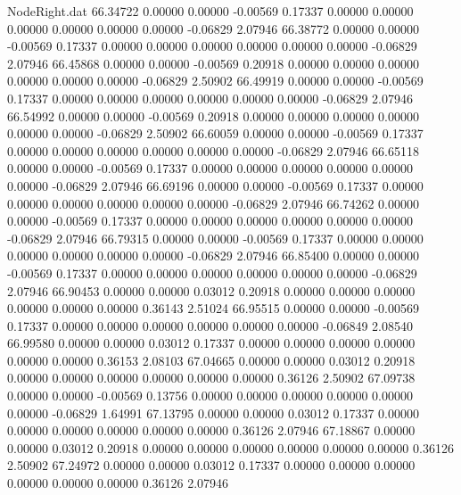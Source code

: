 \begin{filecontents}{NodeRight.dat}
  66.34722    0.00000    0.00000    -0.00569    0.17337    0.00000    0.00000    0.00000    0.00000    0.00000    0.00000   -0.06829    2.07946
  66.38772    0.00000    0.00000    -0.00569    0.17337    0.00000    0.00000    0.00000    0.00000    0.00000    0.00000   -0.06829    2.07946
  66.45868    0.00000    0.00000    -0.00569    0.20918    0.00000    0.00000    0.00000    0.00000    0.00000    0.00000   -0.06829    2.50902
  66.49919    0.00000    0.00000    -0.00569    0.17337    0.00000    0.00000    0.00000    0.00000    0.00000    0.00000   -0.06829    2.07946
  66.54992    0.00000    0.00000    -0.00569    0.20918    0.00000    0.00000    0.00000    0.00000    0.00000    0.00000   -0.06829    2.50902
  66.60059    0.00000    0.00000    -0.00569    0.17337    0.00000    0.00000    0.00000    0.00000    0.00000    0.00000   -0.06829    2.07946
  66.65118    0.00000    0.00000    -0.00569    0.17337    0.00000    0.00000    0.00000    0.00000    0.00000    0.00000   -0.06829    2.07946
  66.69196    0.00000    0.00000    -0.00569    0.17337    0.00000    0.00000    0.00000    0.00000    0.00000    0.00000   -0.06829    2.07946
  66.74262    0.00000    0.00000    -0.00569    0.17337    0.00000    0.00000    0.00000    0.00000    0.00000    0.00000   -0.06829    2.07946
  66.79315    0.00000    0.00000    -0.00569    0.17337    0.00000    0.00000    0.00000    0.00000    0.00000    0.00000   -0.06829    2.07946
  66.85400    0.00000    0.00000    -0.00569    0.17337    0.00000    0.00000    0.00000    0.00000    0.00000    0.00000   -0.06829    2.07946
  66.90453    0.00000    0.00000     0.03012    0.20918    0.00000    0.00000    0.00000    0.00000    0.00000    0.00000    0.36143    2.51024
  66.95515    0.00000    0.00000    -0.00569    0.17337    0.00000    0.00000    0.00000    0.00000    0.00000    0.00000   -0.06849    2.08540
  66.99580    0.00000    0.00000     0.03012    0.17337    0.00000    0.00000    0.00000    0.00000    0.00000    0.00000    0.36153    2.08103
  67.04665    0.00000    0.00000     0.03012    0.20918    0.00000    0.00000    0.00000    0.00000    0.00000    0.00000    0.36126    2.50902
  67.09738    0.00000    0.00000    -0.00569    0.13756    0.00000    0.00000    0.00000    0.00000    0.00000    0.00000   -0.06829    1.64991
  67.13795    0.00000    0.00000     0.03012    0.17337    0.00000    0.00000    0.00000    0.00000    0.00000    0.00000    0.36126    2.07946
  67.18867    0.00000    0.00000     0.03012    0.20918    0.00000    0.00000    0.00000    0.00000    0.00000    0.00000    0.36126    2.50902
  67.24972    0.00000    0.00000     0.03012    0.17337    0.00000    0.00000    0.00000    0.00000    0.00000    0.00000    0.36126    2.07946

\end{filecontents}
